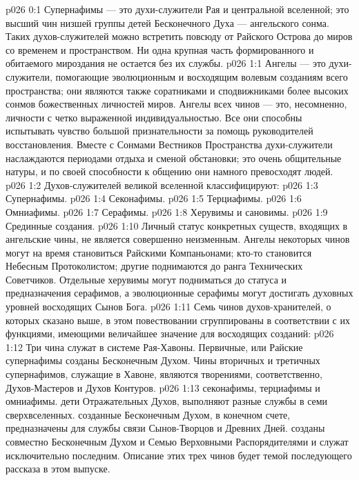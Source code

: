 \author{Совершенствователь Мудрости}
\vs p026 0:1 Супернафимы --- это духи\hyp{}служители Рая и центральной вселенной; это высший чин низшей группы детей Бесконечного Духа --- ангельского сонма. Таких духов\hyp{}служителей можно встретить повсюду от Райского Острова до миров со временем и пространством. Ни одна крупная часть формированного и обитаемого мироздания не остается без их службы.
\vs p026 1:1 Ангелы --- это духи\hyp{}служители, помогающие эволюционным и восходящим волевым созданиям всего пространства; они являются также соратниками и сподвижниками более высоких сонмов божественных личностей миров. Ангелы всех чинов --- это, несомненно, личности с четко выраженной индивидуальностью. Все они способны испытывать чувство большой признательности за помощь руководителей восстановления. Вместе с Сонмами Вестников Пространства духи\hyp{}служители наслаждаются периодами отдыха и сменой обстановки; это очень общительные натуры, и по своей способности к общению они намного превосходят людей.
\vs p026 1:2 \pc Духов\hyp{}служителей великой вселенной классифицируют:
\vs p026 1:3 \bibnobreakspace Супернафимы.
\vs p026 1:4 \bibnobreakspace Секонафимы.
\vs p026 1:5 \bibnobreakspace Терциафимы.
\vs p026 1:6 \bibnobreakspace Омниафимы.
\vs p026 1:7 \bibnobreakspace Серафимы.
\vs p026 1:8 \bibnobreakspace Херувимы и сановимы.
\vs p026 1:9 \bibnobreakspace Срединные создания.
\vs p026 1:10 \pc Личный статус конкретных существ, входящих в ангельские чины, не является совершенно неизменным. Ангелы некоторых чинов могут на время становиться Райскими Компаньонами; кто\hyp{}то становится Небесным Протоколистом; другие поднимаются до ранга Технических Советчиков. Отдельные херувимы могут подниматься до статуса и предназначения серафимов, а эволюционные серафимы могут достигать духовных уровней восходящих Сынов Бога.
\vs p026 1:11 \pc Семь чинов духов\hyp{}хранителей, о которых сказано выше, в этом повествовании сгруппированы в соответствии с их функциями, имеющими величайшее значение для восходящих созданий:
\vs p026 1:12 \bibnobreakspace {} Три чина  служат в системе Рая\hyp{}Хавоны. Первичные, или Райские супернафимы созданы Бесконечным Духом. Чины вторичных и третичных супернафимов, служащие в Хавоне, являются творениями, соответственно, Духов\hyp{}Мастеров и Духов Контуров.
\vs p026 1:13 \bibnobreakspace {} секонафимы, терциафимы и омниафимы.  дети Отражательных Духов, выполняют разные службы в семи сверхвселенных.  созданные Бесконечным Духом, в конечном счете, предназначены для службы связи Сынов\hyp{}Творцов и Древних Дней.  созданы совместно Бесконечным Духом и Семью Верховными Распорядителями и служат исключительно последним. Описание этих трех чинов будет темой последующего рассказа в этом выпуске.
